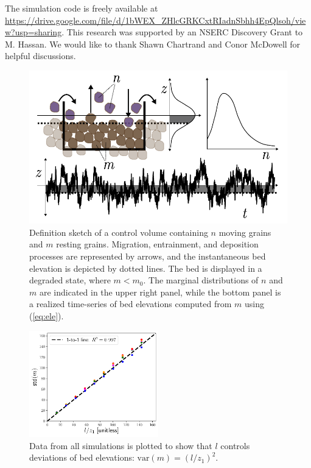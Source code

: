 \documentclass[draft]{agujournal2018}
\begin{document}
\acknowledgments
The simulation code is freely available at
\sloppy
\url{https://drive.google.com/file/d/1bWEX_ZHlcGRKCxtRIadnSbhh4EpQlsoh/view?usp=sharing}.
This research was supported by an NSERC Discovery Grant to M. Hassan.
We would like to thank Shawn Chartrand and Conor McDowell for helpful discussions.



\begin{figure}[h]
	\centering
	\includegraphics[width=\linewidth,keepaspectratio]{./figures/definition-combo.pdf}
	\caption{Definition sketch of a control volume containing $n$ moving grains and $m$ resting grains. Migration, entrainment, and deposition processes are represented by arrows, and the instantaneous bed elevation is depicted by dotted lines. The bed is displayed in a degraded state, where $m<m_0$. The marginal distributions of $n$ and $m$ are indicated in the upper right panel, while the bottom panel is a realized time-series of bed elevations computed from $m$ using (\ref{eq:ele}).}
	\label{fig:concept}
\end{figure}

\begin{figure}[h]%
	\centering
	\includegraphics[width=0.5\textwidth,keepaspectratio]{./figures/variance.pdf}
	\caption{Data from all simulations is plotted to show that $l$ controls deviations of bed elevations: $\text{var}(m) = (l/z_1)^2$. }
	\label{fig:var}
\end{figure}
\end{document}
